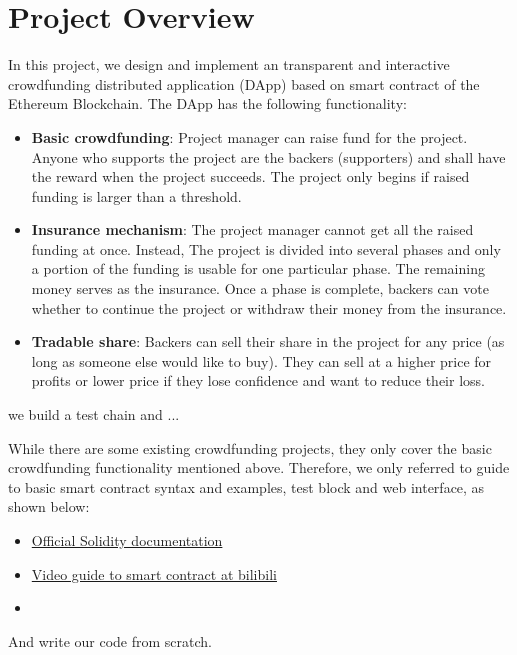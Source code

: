 \documentclass{article}
\begin{document}
\section{Project Overview}
\label{sec:proj}
In this project, we design and implement an transparent and interactive crowdfunding distributed application (DApp) based on smart contract of the Ethereum Blockchain. The DApp has the following functionality:
\begin{itemize}
    \item \textbf{Basic crowdfunding}: Project manager can raise fund for the project. Anyone who supports the project are the backers (supporters) and shall have the reward when the project succeeds. The project only begins if raised funding is larger than a threshold.
    \item \textbf{Insurance mechanism}: The project manager cannot get all the raised funding at once. Instead, The project is divided into several phases and only a portion of the funding is usable for one particular phase. The remaining money serves as the insurance. Once a phase is complete, backers can vote whether to continue the project or withdraw their money from the insurance.
    \item \textbf{Tradable share}: Backers can sell their share in the project for any price (as long as someone else would like to buy). They can sell at a higher price for profits or lower price if they lose confidence and want to reduce their loss.
\end{itemize}


we build a test chain and ...

While there are some existing crowdfunding projects, they only cover the basic crowdfunding functionality mentioned above. Therefore, we only referred to guide to basic smart contract syntax and examples, test block and web interface, as shown below: 
\begin{itemize}
    \item \href{https://solidity-cn.readthedocs.io/zh/develop/}{Official Solidity documentation}
    \item \href{https://www.bilibili.com/video/BV1St411a7Pk?from=search&seid=14561516389879407384}{Video guide to smart contract at bilibili}
    \item 
\end{itemize}
And write our code from scratch.

\end{document}
